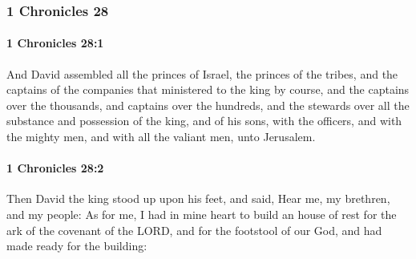 	\subsubsection{1 Chronicles 28} %
		\label{1CHRONICLES-28}

		\paragraph{1 Chronicles 28:1} %
			\label{1CHRONICLES-28-1}

			And David assembled all the princes of Israel, the princes of the tribes, and the captains of the companies that ministered to the king by course, and the captains over the thousands, and captains over the hundreds, and the stewards over all the substance and possession of the king, and of his sons, with the officers, and with the mighty men, and with all the valiant men, unto Jerusalem.


		\paragraph{1 Chronicles 28:2} %
			\label{1CHRONICLES-28-2}

			Then David the king stood up upon his feet, and said, Hear me, my brethren, and my people: As for me, I had in mine heart to build an house of rest for the ark of the covenant of the LORD, and for the footstool of our God, and had made ready for the building:

